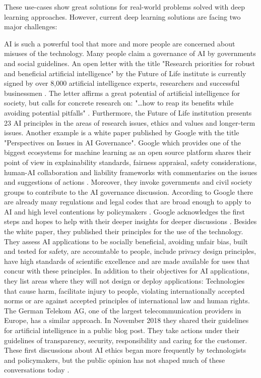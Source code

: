 These use-cases show great solutions for real-world problems solved with deep learning approaches.
However, current deep learning solutions are facing two major challenges:

AI is such a powerful tool that more and more people are concerned about misuses of the technology.
Many people claim a governance of AI by governments and social guidelines.
An open letter with the title "Research priorities for robust and beneficial artificial intelligence" by the Future of Life institute is currently signed by over 8,000 artificial intelligence experts, researchers and successful businessmen \cite{futureoflife-ai-open-letter, futureoflife-research-priorities}.
The letter affirms a great potential of artificial intelligence for society, but calls for concrete research on: "…how to reap its benefits while avoiding potential pitfalls" \cite{futureoflife-ai-open-letter}.
Furthermore, the Future of Life institution presents 23 AI principles in the areas of research issues, ethics and values and longer-term issues. \cite{futureoflife-ai-principles}
\hfill \break
Another example is a white paper published by Google with the title "Perspectives on Issues in AI Governance".
Google which provides one of the biggest ecosystems for machine learning as an open source platform shares their point of view in explainability standards, fairness appraisal, safety considerations, human-AI collaboration and liability frameworks with commentaries on the issues and suggestions of actions \cite{google-ai-governance}.
Moreover, they invoke governments and civil society groups to contribute to the AI governance discussion.
According to Google there are already many regulations and legal codes that are broad enough to apply to AI and high level contentions by policymakers \cite[page 3]{google-ai-governance}.
Google acknowledges the first steps and hopes to help with their deeper insights for deeper discussions \cite[page 4]{google-ai-governance}.
\hfill \break
Besides the white paper, they published their principles for the use of the technology.
They assess AI applications to be socially beneficial, avoiding unfair bias, built and tested for safety, are accountable to people, include privacy design principles, have high standards of scientific excellence and are made available for uses that concur with these principles.
In addition to their objectives for AI applications, they list areas where they will not design or deploy applications:
Technologies that cause harm, facilitate injury to people, violating internationally accepted norms or are against accepted principles of international law and human rights.
\cite{google-ai-principles}
\hfill \break
The German Telekom AG, one of the largest telecommunication providers in Europe, has a similar approach.
In November 2018 they shared their guidelines for artificial intelligence in a public blog post.
They take actions under their guidelines of transparency, security, responsibility and caring for the customer.
\cite{telekom-ai-guidelines}
\hfill \break
These first discussions about AI ethics began more frequently by technologists and policymakers, but the public opinion has not shaped much of these conversations today \cite{governanceai_public_report}.

